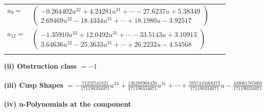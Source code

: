 \documentclass[1p]{elsarticle_modified}
\theoremstyle{definition}
\begin{document}
\begin{tabular}{m{7pt} m{180pt} m{7pt} m{180pt} }
\flushright $a_{9}=$&$\begin{pmatrix}-0.264402 u^{32}+4.24281 u^{31}+\cdots-27.6237 u+5.38349\\2.69469 u^{32}-18.4334 u^{31}+\cdots+18.1980 u-3.92517\end{pmatrix}$ \\
\flushright $a_{12}=$&$\begin{pmatrix}-1.35910 u^{32}+12.0492 u^{31}+\cdots-33.5143 u+3.10913\\3.64636 u^{32}-25.3633 u^{31}+\cdots+26.2232 u-4.54568\end{pmatrix}$\\&\end{tabular}
\flushleft \textbf{(ii) Obstruction class $= -1$}\\~\\
\flushleft \textbf{(iii) Cusp Shapes $= -\frac{71232541821}{171190334071} u^{32}+\frac{136288968420}{171190334071} u^{31}+\cdots+\frac{5957445668473}{171190334071} u-\frac{448061765060}{171190334071}$}\\~\\
\newpage\renewcommand{\arraystretch}{1}
\flushleft \textbf{(iv) u-Polynomials at the component}\newline \\
\end{document}
